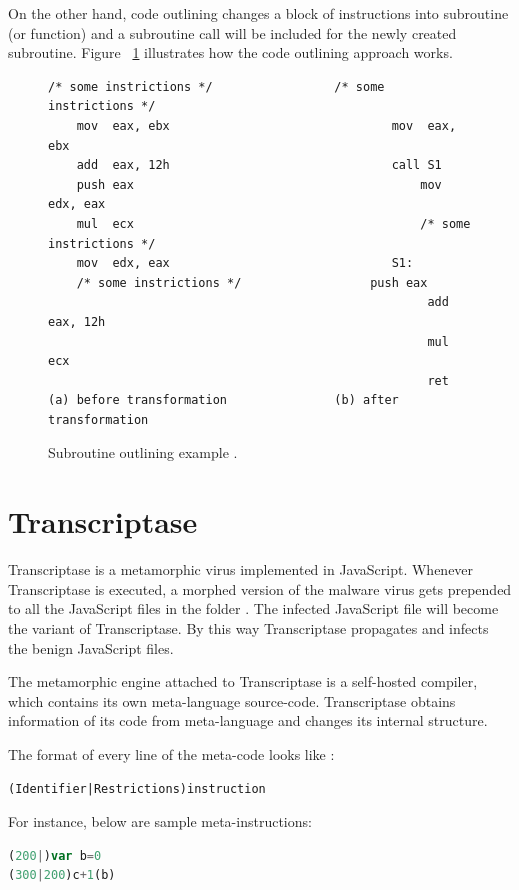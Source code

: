 On the other hand, code outlining changes a block of instructions into subroutine (or function) and a subroutine call will be included for the newly created subroutine. Figure ~\ref{fig:subroutineoutline} illustrates how the code outlining approach works.
\begin{figure}
  \centering
  \begin{lstlisting}[language=myasm]
	/* some instrictions */					/* some instrictions */
	mov  eax, ebx								mov  eax, ebx
	add  eax, 12h								call S1
	push eax										mov  edx, eax
	mul  ecx										/* some instrictions */
	mov  edx, eax								S1: 
	/* some instrictions */ 				 push eax
										 	 	 	 add  eax, 12h
										 	 	 	 mul  ecx
										 	 	 	 ret
(a) before transformation				(b) after transformation
\end{lstlisting}


    \caption[Subroutine outlining example]{Subroutine outlining example \cite{bib25}.}
    \label{fig:subroutineoutline}
\end{figure}

\section{Transcriptase} \label{transcriptasesection}

Transcriptase is a metamorphic virus implemented in JavaScript. Whenever Transcriptase is executed, a morphed version of the malware virus gets prepended to all the JavaScript files in the folder \cite{bib4}. The infected JavaScript file will become the variant of Transcriptase. By this way Transcriptase propagates and infects the benign JavaScript files.
  
The metamorphic engine attached to Transcriptase is a self-hosted compiler, which contains its own meta-language source-code. Transcriptase obtains information of its code from meta-language and changes its internal structure. 

The format of every line of the meta-code looks like \cite{bib26}:

\begin{lstlisting}[frame=none,numbers=none]
(Identifier|Restrictions)instruction
\end{lstlisting}
For instance, below are sample meta-instructions:

\begin{lstlisting}[frame=none,numbers=none,language=JavaScript]
(200|)var b=0
(300|200)c+1(b)
\end{lstlisting}

